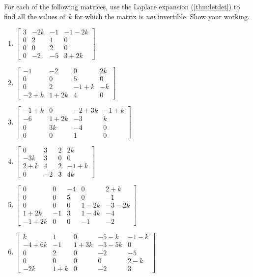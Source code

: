 \begin{exercise} \label{ex:} 
For each of the following matrices, use the Laplace expansion (\autoref{thm:letdet}) to find all the values of~\(k\) for which the matrix is \emph{not} invertible.
Show your working.

\begin{enumerate}
\item \(\begin{bmatrix} 3 & -2k & -1 & -1-2k
\\0 & 2 & 1 & 0
\\0 & 0 & 2 & 0
\\0 & -2 & -5 & 3+2k \end{bmatrix}\)

\item \(\begin{bmatrix} -1 & -2 & 0 & 2k
\\0 & 0 & 5 & 0
\\0 & 2 & -1+k & -k
\\-2+k & 1+2k & 4 & 0 \end{bmatrix}\)

\item \(\begin{bmatrix} -1+k & 0 & -2+3k & -1+k
\\-6 & 1+2k & -3 & k
\\0 & 3k & -4 & 0
\\0 & 0 & 1 & 0 \end{bmatrix}\)

\item \(\begin{bmatrix} 0 & 3 & 2 & 2k
\\-3k & 3 & 0 & 0
\\2+k & 4 & 2 & -1+k
\\0 & -2 & 3 & 4k \end{bmatrix}\)

\item \(\begin{bmatrix} 0 & 0 & -4 & 0 & 2+k
\\0 & 0 & 5 & 0 & -1
\\0 & 0 & 0 & 1-2k & -3-2k
\\1+2k & -1 & 3 & 1-4k & -4
\\-1+2k & 0 & 0 & -1 & -2 \end{bmatrix}\)

\item \(\begin{bmatrix} k & 1 & 0 & -5-k & -1-k
\\-4+6k & -1 & 1+3k & -3-5k & 0
\\0 & 2 & 0 & -2 & -5
\\0 & 0 & 0 & 0 & 2-k
\\-2k & 1+k & 0 & -2 & 3 \end{bmatrix}\)

\end{enumerate}
\end{exercise}
